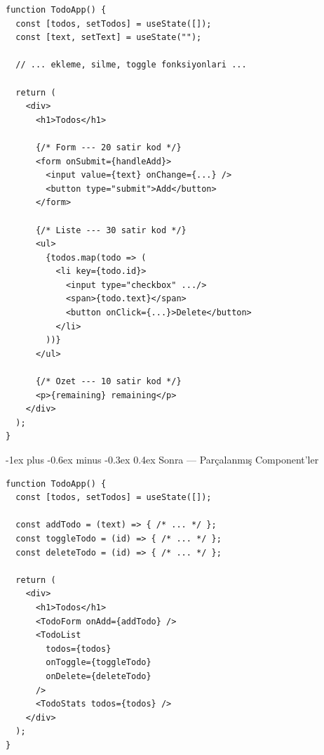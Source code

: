 \documentclass[12pt, a4paper]{article}
\makeatletter
\renewcommand{\subsubsection}{%
  \@startsection{subsubsection}{3}{\z@}%
    {-1ex plus -0.6ex minus -0.3ex}%
    {0.4ex}%
    {\normalfont\normalsize\bfseries\sffamily\color{accent}}%
}
\makeatother
\begin{document}
\begin{tcolorbox}[enhanced, colback=codebg, colframe=gray!30,
    colbacktitle=danger!85!black, coltitle=white, arc=4pt,
    title={\sffamily\bfseries\small \faTimes\ TodoApp.tsx --- Her şey tek dosyada}]
\begin{lstlisting}[style=jsxstyle]
function TodoApp() {
  const [todos, setTodos] = useState([]);
  const [text, setText] = useState("");

  // ... ekleme, silme, toggle fonksiyonlari ...

  return (
    <div>
      <h1>Todos</h1>

      {/* Form --- 20 satir kod */}
      <form onSubmit={handleAdd}>
        <input value={text} onChange={...} />
        <button type="submit">Add</button>
      </form>

      {/* Liste --- 30 satir kod */}
      <ul>
        {todos.map(todo => (
          <li key={todo.id}>
            <input type="checkbox" .../>
            <span>{todo.text}</span>
            <button onClick={...}>Delete</button>
          </li>
        ))}
      </ul>

      {/* Ozet --- 10 satir kod */}
      <p>{remaining} remaining</p>
    </div>
  );
}
\end{lstlisting}
\end{tcolorbox}

\vspace{6pt}

\subsubsection{Sonra --- Parçalanmış Component'ler}

\begin{tcolorbox}[enhanced, colback=codebg, colframe=gray!30,
    colbacktitle=accent!85!black, coltitle=white, arc=4pt,
    title={\sffamily\bfseries\small \faCheck\ TodoApp.tsx --- Sadece koordinasyon}]
\begin{lstlisting}[style=jsxstyle]
function TodoApp() {
  const [todos, setTodos] = useState([]);

  const addTodo = (text) => { /* ... */ };
  const toggleTodo = (id) => { /* ... */ };
  const deleteTodo = (id) => { /* ... */ };

  return (
    <div>
      <h1>Todos</h1>
      <TodoForm onAdd={addTodo} />
      <TodoList
        todos={todos}
        onToggle={toggleTodo}
        onDelete={deleteTodo}
      />
      <TodoStats todos={todos} />
    </div>
  );
}
\end{lstlisting}
\end{tcolorbox}
\end{document}

